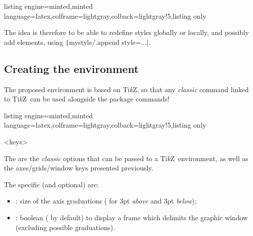 \documentclass[11pt,a4paper]{ltxdoc}
\providecommand\tikzlogo{Ti\textit{k}Z}
\let\TikZ\tikzlogo
\begin{document}
\begin{tcblisting}{listing engine=minted,minted language=latex,colframe=lightgray,colback=lightgray!5,listing only}
\end{tcblisting}

The idea is therefore to be able to redefine styles globally or locally, and possibly add elements, using \texttt|mystyle/.append style={...}|.

\subsection{Creating the environment}\label{creaenvt}

The proposed environment is based on \TikZ, so that any \textit{classic} command linked to \TikZ\ can be used alongside the package commands!

\begin{tcblisting}{listing engine=minted,minted language=latex,colframe=lightgray,colback=lightgray!5,listing only}
\begin{GraphTikz}<keys>
\end{GraphTikz}
\end{tcblisting}

The  are the \textit{classic} options that can be passed to a \TikZ\ environment, as well as the \textsf{axes/grids/window} keys presented previously.

\smallskip

The specific (and optional)  are:

\smallskip

\begin{itemize}
	\item {}: size of the axis graduations (\MontreCode{3pt} for 3pt \textit{above} and 3pt \textit{below});
	\item {}: boolean ( by default) to display a frame which delimits the graphic window (excluding possible graduations).
\end{itemize}
\end{document}
